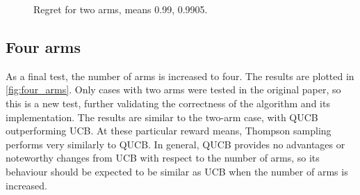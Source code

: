 \begin{figure}
    \centering
    \caption{Regret for two arms, means 0.99, 0.9905.}
    \label{fig:high_prob}
\end{figure}

\subsection{Four arms}
As a final test, the number of arms is increased to four.
The results are plotted in \cref{fig:four_arms}.
Only cases with two arms were tested in the original paper, so this is a new test, further validating the correctness of the algorithm and its implementation.
The results are similar to the two-arm case, with QUCB outperforming UCB.
At these particular reward means, Thompson sampling performs very similarly to QUCB.
In general, QUCB provides no advantages or noteworthy changes from UCB with respect to the number of arms, so its behaviour should be expected to be similar as UCB when the number of arms is increased.

